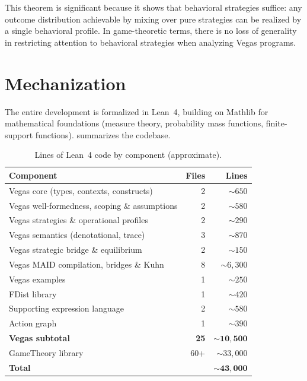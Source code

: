 \documentclass[11pt]{article}
\begin{document}
This theorem is significant because it shows that behavioral strategies
suffice: any outcome distribution achievable by mixing over pure strategies
can be realized by a single behavioral profile. In game-theoretic terms, there
is no loss of generality in restricting attention to behavioral strategies
when analyzing Vegas programs.


\section{Mechanization}\label{sec:mechanization}

The entire development is formalized in Lean~4, building on Mathlib for
mathematical foundations (measure theory, probability mass functions,
finite-support functions).  summarizes the codebase.

\begin{table}[ht]
\centering
\begin{tabular}{lrr}
\toprule
Component & Files & Lines \\
\midrule
Vegas core (types, contexts, constructs) & 2 & ${\sim}650$ \\
Vegas well-formedness, scoping \& assumptions & 2 & ${\sim}580$ \\
Vegas strategies \& operational profiles & 2 & ${\sim}290$ \\
Vegas semantics (denotational, trace) & 3 & ${\sim}870$ \\
Vegas strategic bridge \& equilibrium & 2 & ${\sim}150$ \\
Vegas MAID compilation, bridges \& Kuhn & 8 & ${\sim}6{,}300$ \\
Vegas examples & 1 & ${\sim}250$ \\
FDist library & 1 & ${\sim}420$ \\
Supporting expression language & 2 & ${\sim}580$ \\
Action graph & 1 & ${\sim}390$ \\
\midrule
\textbf{Vegas subtotal} & \textbf{25} & $\mathbf{{\sim}10{,}500}$ \\
\midrule
GameTheory library & 60+ & ${\sim}33{,}000$ \\
\midrule
\textbf{Total} & & $\mathbf{{\sim}43{,}000}$ \\
\bottomrule
\end{tabular}
\caption{Lines of Lean~4 code by component (approximate).}\label{tab:loc}
\end{table}
\end{document}
